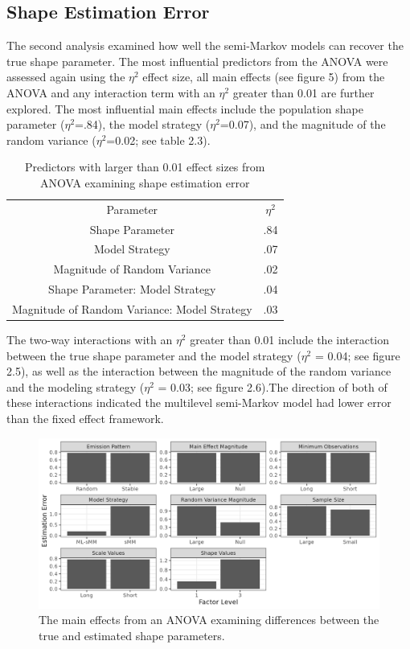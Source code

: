 \documentclass[12pt]{./styles/outhesis}
\begin{document}
\newpage
\newpage


\subsection{Shape Estimation Error}

The second analysis examined how well the semi-Markov models can recover
the true shape parameter. The most influential predictors from the ANOVA
were assessed again using the \(\eta^2\) effect size, all main effects
(see figure 5) from the ANOVA and any interaction term with an
\(\eta^2\) greater than 0.01 are further explored. The most influential
main effects include the population shape parameter (\(\eta^2\)=.84),
the model strategy (\(\eta^2\)=0.07), and the magnitude of the random
variance (\(\eta^2\)=0.02; see table 2.3).


\begin{table}
    \centering
    \begin{tabular}{cc}
        Parameter & \(\eta^2\)\\
        Shape Parameter & .84 \\
        Model Strategy & .07 \\
        Magnitude of Random Variance & .02 \\
        Shape Parameter: Model Strategy & .04 \\
        Magnitude of Random Variance: Model Strategy & .03 \\
    \end{tabular}
    \caption{Predictors with larger than 0.01 effect sizes from ANOVA
examining shape estimation error}
    \label{tab:my_label}
\end{table}

The two-way interactions with an \(\eta^2\) greater than 0.01 include
the interaction between the true shape parameter and the model strategy
(\(\eta^2\) = 0.04; see figure 2.5), as well as the interaction between
the magnitude of the random variance and the modeling strategy
(\(\eta^2\) = 0.03; see figure 2.6).The direction of both of these
interactions indicated the multilevel semi-Markov model had lower error
than the fixed effect framework.

\newpage


\begin{figure}
\includegraphics[width=15cm]{figures/anova2MainEffect.png}
\caption{The main effects from an ANOVA examining differences between
the true and estimated shape parameters.}
\end{figure}
\end{document}
